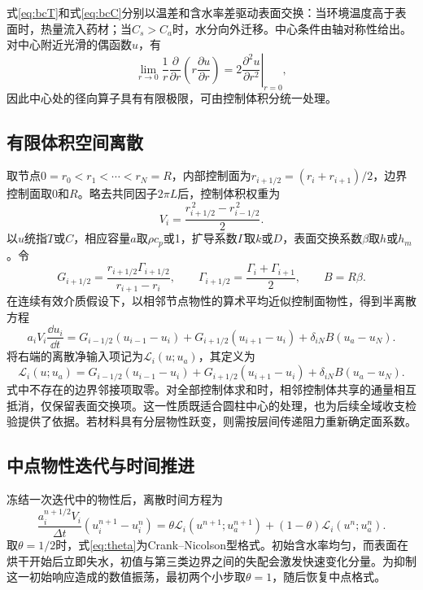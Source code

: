 式\eqref{eq:bcT}和式\eqref{eq:bcC}分别以温差和含水率差驱动表面交换：当环境温度高于表面时，热量流入药材；当$C_s>C_a$时，水分向外迁移。中心条件由轴对称性给出。对中心附近光滑的偶函数$u$，有
\begin{equation}
\lim_{r\to0}\frac1r\frac{\partial}{\partial r}\left(r\frac{\partial u}{\partial r}\right)=2\left.\frac{\partial^2 u}{\partial r^2}\right|_{r=0},
\end{equation}
因此中心处的径向算子具有有限极限，可由控制体积分统一处理。

\subsection{有限体积空间离散}
取节点$0=r_0<r_1<\cdots<r_N=R$，内部控制面为$r_{i+1/2}=(r_i+r_{i+1})/2$，边界控制面取0和$R$。略去共同因子$2\pi L$后，控制体积权重为
\begin{equation}
V_i=\frac{r_{i+1/2}^{\,2}-r_{i-1/2}^{\,2}}2.
\end{equation}
以$u$统指$T$或$C$，相应容量$a$取$\rho c_p$或1，扩导系数$\Gamma$取$k$或$D$，表面交换系数$\beta$取$h$或$h_m$。令
\begin{equation}
G_{i+1/2}=\frac{r_{i+1/2}\Gamma_{i+1/2}}{r_{i+1}-r_i},\qquad
\Gamma_{i+1/2}=\frac{\Gamma_i+\Gamma_{i+1}}2,\qquad B=R\beta.
\end{equation}
在连续有效介质假设下，以相邻节点物性的算术平均近似控制面物性，得到半离散方程
\begin{equation}
a_iV_i\frac{\dd u_i}{\dd t}=
G_{i-1/2}(u_{i-1}-u_i)+G_{i+1/2}(u_{i+1}-u_i)
+\delta_{iN}B(u_a-u_N).
\label{eq:fvm}
\end{equation}
将右端的离散净输入项记为$\mathcal L_i(u;u_a)$，其定义为
\begin{equation*}
\mathcal L_i(u;u_a)=
G_{i-1/2}(u_{i-1}-u_i)+G_{i+1/2}(u_{i+1}-u_i)
+\delta_{iN}B(u_a-u_N).
\end{equation*}
式中不存在的边界邻接项取零。对全部控制体求和时，相邻控制体共享的通量相互抵消，仅保留表面交换项。这一性质既适合圆柱中心的处理，也为后续全域收支检验提供了依据\cite{nht}。若材料具有分层物性跃变，则需按层间传递阻力重新确定面系数。

\subsection{中点物性迭代与时间推进}
冻结一次迭代中的物性后，离散时间方程为
\begin{equation}
\frac{a_i^{n+1/2}V_i}{\Delta t}(u_i^{n+1}-u_i^n)
=\theta\mathcal L_i(u^{n+1};u_a^{n+1})
+(1-\theta)\mathcal L_i(u^n;u_a^n).
\label{eq:theta}
\end{equation}
取$\theta=1/2$时，式\eqref{eq:theta}为Crank--Nicolson型格式\cite{cn}。初始含水率均匀，而表面在烘干开始后立即失水，初值与第三类边界之间的失配会激发快速变化分量。为抑制这一初始响应造成的数值振荡，最初两个小步取$\theta=1$，随后恢复中点格式。

